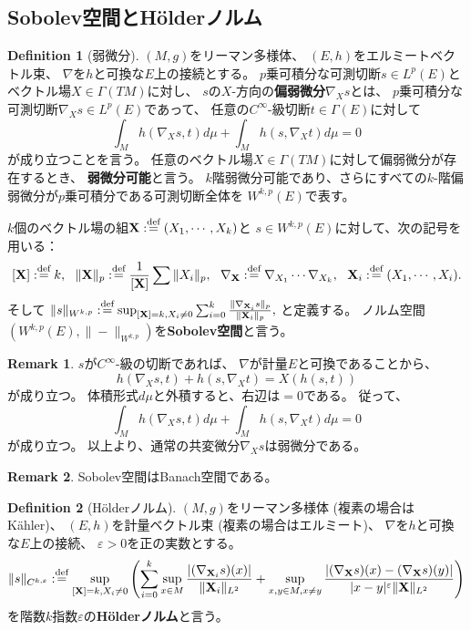 \documentclass[uplatex]{jsarticle}
\theoremstyle{definition}
\newtheorem{defi}[defi]{Definition}
\newtheorem{rem}[rem]{Remark}
\newcommand{\ep}{\varepsilon}
\newcommand{\dfn}{:\overset{\mbox{{\scriptsize def}}}{=}}
\newcommand{\bfX}{\mathbf{X}}
\begin{document}
\subsection{Sobolev空間とH\"{o}lderノルム}


\begin{defi}[弱微分]
  \((M,g)\)をリーマン多様体、
  \((E,h)\)をエルミートベクトル束、
  \(\nabla\)を\(h\)と可換な\(E\)上の接続とする。
  \(p\)乗可積分な可測切断\(s\in L^p(E)\)と
  ベクトル場\(X\in \Gamma(TM)\)に対し、
  \(s\)の\(X\)-方向の\textbf{偏弱微分}\(\nabla_Xs\)とは、
  \(p\)乗可積分な可測切断\(\nabla_Xs\in L^p(E)\)であって、
  任意の\(C^{\infty}\)-級切断\(t\in \Gamma(E)\)に対して
  \[
  \int_M h(\nabla_Xs,t) d\mu + \int_M h(s,\nabla_Xt) d\mu = 0
  \]
  が成り立つことを言う。
  任意のベクトル場\(X\in \Gamma(TM)\)に対して偏弱微分が存在するとき、
  \textbf{弱微分可能}と言う。
  \(k\)階弱微分可能であり、さらにすべての\(k\)-階偏弱微分が\(p\)乗可積分である可測切断全体を
  \(W^{k,p}(E)\)で表す。

  \(k\)個のベクトル場の組\(\bfX \dfn (X_1,\cdots,X_k)\)と
  \(s\in W^{k,p}(E)\)に対して、次の記号を用いる：
  \[
  [\bfX] \dfn k, \ \
  \|\bfX\|_p \dfn \frac{1}{[\bfX]}\sum \|X_i\|_p, \ \
  \nabla_{\bfX} \dfn \nabla_{X_1}\cdots \nabla_{X_k}, \ \
  \bfX_i \dfn (X_1,\cdots,X_i).
  \]
  そして
  \(
  \|s\|_{W^{k,p}} \dfn
  \sup_{[\bfX] = k,X_i\neq 0}\sum_{i=0}^k \frac{\|\nabla_{\bfX_i}s\|_p}{\|\bfX_i\|_p},
  \)
  と定義する。
  ノルム空間\((W^{k,p}(E),\|-\|_{W^{k,p}})\)を\textbf{Sobolev空間}と言う。
\end{defi}

\begin{rem}
  \(s\)が\(C^{\infty}\)-級の切断であれば、
  \(\nabla\)が計量\(E\)と可換であることから、
  \[
  h(\nabla_Xs,t) + h(s,\nabla_Xt) = X(h(s,t))
  \]
  が成り立つ。
  体積形式\(d\mu\)と外積すると、右辺は\(=0\)である。
  従って、
  \[
  \int_M h(\nabla_Xs,t) d\mu + \int_M h(s,\nabla_Xt) d\mu = 0
  \]
  が成り立つ。
  以上より、通常の共変微分\(\nabla_Xs\)は弱微分である。
\end{rem}

\begin{rem}
  Sobolev空間はBanach空間である。
\end{rem}





\begin{defi}[H\"{o}lderノルム]
  \((M,g)\)をリーマン多様体 (複素の場合はK\"{a}hler)、
  \((E,h)\)を計量ベクトル束 (複素の場合はエルミート)、
  \(\nabla\)を\(h\)と可換な\(E\)上の接続、
  \(\ep > 0\)を正の実数とする。
  \[
  \|s\|_{C^{k,\ep}} \dfn \sup_{[\bfX] = k, X_i\neq 0}
  \left( \sum_{i=0}^k \sup_{x\in M} \frac{|(\nabla_{\bfX_i}s)(x)|}{\|\bfX_i\|_{L^2}} +
  \sup_{x,y\in M, x\neq y}\frac{|(\nabla_{\bfX}s)(x) - (\nabla_{\bfX}s)(y)|}{|x-y|^{\ep}\|\bfX\|_{L^2}}\right)
  \]
  を階数\(k\)指数\(\ep\)の\textbf{H\"{o}lderノルム}と言う。
\end{defi}
\end{document}
